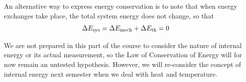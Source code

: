 An alternative way to express energy conservation is to note that when energy
exchanges take place, the total system energy does not change, so that
\[
\Delta E_{\rm sys}=\Delta E_{\rm mech}+\Delta E_{\rm th} = 0\]


We are not prepared in this part of the course to consider the nature of internal energy or its actual measurement, so the Law of Conservation of Energy will
for now remain an untested hypothesis. However, we will re-consider the concept
of internal energy next semester when we deal with heat and temperature.

